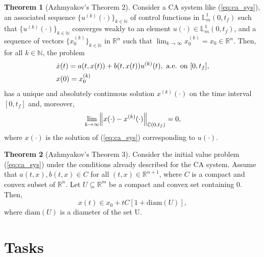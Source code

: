 \documentclass[11pt,letterpaper]{article}
\newcommand{\NN}{{\mathbb{N}}}
\newcommand{\LL}{{\mathbb{L}}}
\newcommand{\RR}{{\mathbb{R}}}
\let\originalleft\left
\let\originalright\right
\renewcommand{\left}{\mathopen{}\mathclose\bgroup\originalleft}
\renewcommand{\right}{\aftergroup\egroup\originalright}
\newcommand{\norm}[1]{\left\lVert#1\right\rVert}
\theoremstyle{definition}
\newtheorem{theorem}{Theorem}[section]
\begin{document}
\begin{theorem}[Azhmyakov's Theorem 2]\label{th:2}
Consider a CA system like (\ref{eq:ca_sys}), an associated sequence $\{u^{(k)}(\cdot)\}_{k\in\NN}$ of control functions in $\LL_m^1(0,t_f)$ such that $\{u^{(k)}(\cdot)\}_{k\in\NN}$ converges weakly to an element $u(\cdot)\in\LL_m^1(0,t_f)$, and a sequence of vectors $\{x_0^{(k)}\}_{k\in\NN}$ in $\RR^n$ such that $\lim_{k\rightarrow\infty}x_0^{(k)}=x_0\in\RR^n$. Then, for all $k\in\NN$, the problem
\begin{equation}
    \begin{split}
    &\dot{x}(t)=a\left(t,x(t)\right) + b\left(t,x(t)\right)u^{(k)}(t), \ \text{a.e. on } [0, t_f],\\
    &x(0)=x_0^{(k)}
    \end{split}
\end{equation}
has a unique and absolutely continuous solution $x^{(k)}(\cdot)$ on the time interval $[0,t_f]$ and, moreover,
\begin{equation}
    \lim_{k\rightarrow\infty}\norm{x(\cdot)-x^{(k)}(\cdot)}_{\mathbb{C}(0,t_f)}=0,
\end{equation}
where $x(\cdot)$ is the solution of (\ref{eq:ca_sys}) corresponding to $u(\cdot)$.
\end{theorem}

\begin{theorem}[Azhmyakov's Theorem 3]\label{th:3}
Consider the initial value problem (\ref{eq:ca_sys}) under the conditions already described for the CA system. Assume that $a(t,x),b(t,x)\in C$ for all $(t,x)\in\RR^{n+1}$, where $C$ is a compact and convex subset of $\RR^n$. Let $U\subseteq\RR^m$ be a compact and convex set containing 0. Then,
\begin{equation}
    x(t)\in x_0+tC[1+\mathrm{diam}(U)],
\end{equation}
where $\mathrm{diam}(U)$ is a diameter of the set U.
\end{theorem}


\section{Tasks}
\end{document}
